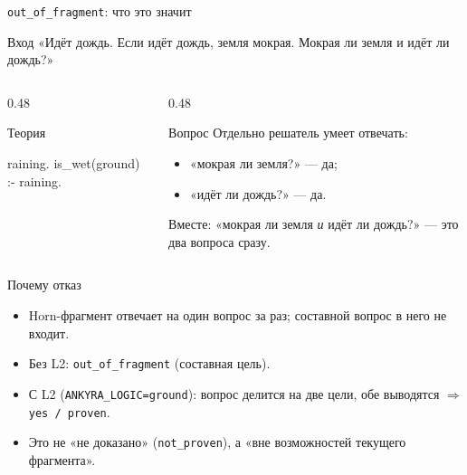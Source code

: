 \documentclass[aspectratio=169,11pt]{beamer}
\newcommand{\Rej}[1]{\textcolor{rejectcolor}{#1}}
\newcommand{\Prov}[1]{\textcolor{provencolor}{#1}}
\begin{document}
\begin{frame}[fragile,shrink=3]{\texttt{out\_of\_fragment}: что это значит}
  \footnotesize
  \begin{block}{Вход}
    «Идёт дождь. Если идёт дождь, земля мокрая.
    Мокрая ли земля и идёт ли дождь?»
  \end{block}

  \begin{columns}[T,onlytextwidth]
    \begin{column}{0.48\textwidth}
      \begin{block}{Теория}
\begin{semiverbatim}
raining.
is_wet(ground) :- raining.
\end{semiverbatim}
      \end{block}
    \end{column}
    \begin{column}{0.48\textwidth}
      \begin{block}{Вопрос}
        Отдельно решатель умеет отвечать:
        \begin{itemize}
          \item «мокрая ли земля?» --- да;
          \item «идёт ли дождь?» --- да.
        \end{itemize}
        Вместе: «мокрая ли земля \emph{и} идёт ли дождь?» ---
        это два вопроса сразу.
      \end{block}
    \end{column}
  \end{columns}

  \begin{block}{Почему отказ}
    \begin{itemize}
      \item Horn-фрагмент отвечает на один вопрос за раз; составной вопрос
            в него не входит.
      \item Без L2: \Rej{\texttt{out\_of\_fragment}} (составная цель).
      \item С L2 (\texttt{ANKYRA\_LOGIC=ground}): вопрос делится на две
            цели, обе выводятся \(\Rightarrow\) \Prov{\texttt{yes / proven}}.
      \item Это не «не доказано» (\texttt{not\_proven}), а «вне возможностей
            текущего фрагмента».
    \end{itemize}
  \end{block}
\end{frame}
\end{document}
